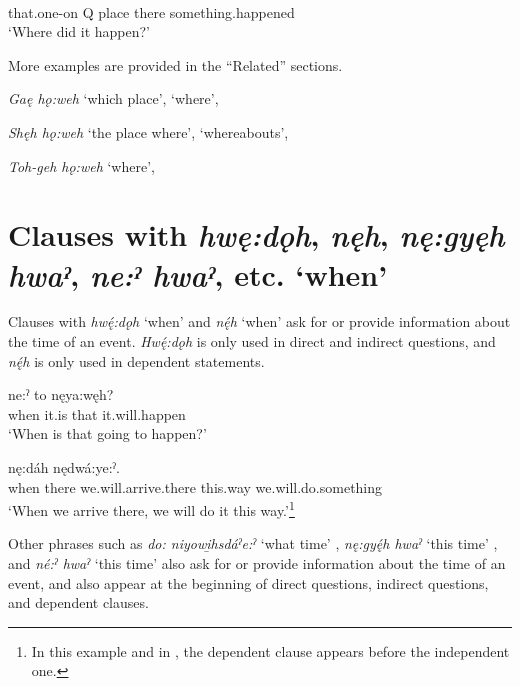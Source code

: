 \ea\label{ex:where3}
\\
that.one-on Q place there something.happened\\
\glt ‘Where did it happen?’
\z



More examples are provided in the “Related” sections. 

\begin{CayugaRelated}
\item{}\textit{Gaę hǫ:weh} ‘which place’, ‘where’, 

\item{}\textit{Shęh hǫ:weh} ‘the place where’, ‘whereabouts’, 

\item{}\textit{Toh-geh hǫ:weh} ‘where’, 
\end{CayugaRelated}


\section{Clauses with \textit{hwę:dǫh}, \textit{nęh}, \textit{nę:gyęh hwaˀ}, \textit{ne:ˀ hwaˀ}, etc. ‘when’} \label{ch:Clauses with [hwę:dǫh], [nęh], [nę:gyęh hwaˀ], [ne:ˀ hwaˀ], etc. ‘when’}
Clauses with \textit{hwę́:dǫh} ‘when’  and \textit{nę́h} ‘when’  ask for or provide information about the time of an event. \textit{Hwę́:dǫh} is only used in direct and indirect questions, and \textit{nę́h} is only used in dependent statements.

\ea\label{ex:when1} 
\gll {} ne:ˀ to nęya:węh? \\
when it.is that it.will.happen\\
\glt ‘When is that going to happen?’ 
\z

\ea\label{ex:when2} 
 nę:dáh nędwá:ye:ˀ. \\
when there we.will.arrive.there this.way we.will.do.something\\
\glt ‘When we arrive there, we will do it this way.’\footnote{In this example and in , the dependent clause appears before the independent one.}
\z

 Other phrases such as \textit{do: niyowi̱hsdáˀe:ˀ} ‘what time’ , \textit{nę:gyę́h hwaˀ} ‘this time’ , and \textit{né:ˀ hwaˀ} ‘this time’  also ask for or provide information about the time of an event, and also appear at the beginning of direct questions, indirect questions, and dependent clauses.
 

